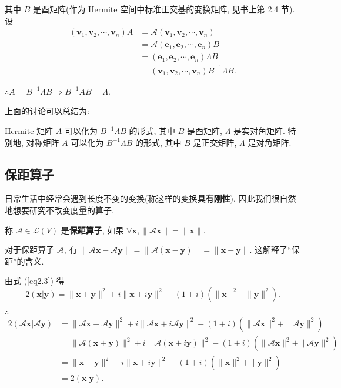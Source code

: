 \documentclass[color=black,device=normal,lang=cn,mode=geye]{elegantnote}
\begin{document}
其中 $B$ 是酉矩阵(作为 Hermite 空间中标准正交基的变换矩阵, 见书上第 2.4 节). 设
\begin{align*}
    (\boldsymbol{v}_1,\boldsymbol{v}_2,\cdots,\boldsymbol{v}_n)A & =\mathcal{A}(\boldsymbol{v}_1,\boldsymbol{v}_2,\cdots,\boldsymbol{v}_n) \\
    & =\mathcal{A}(\boldsymbol{e}_1,\boldsymbol{e}_2,\cdots,\boldsymbol{e}_n)B \\
    & =(\boldsymbol{e}_1,\boldsymbol{e}_2,\cdots,\boldsymbol{e}_n)\Lambda B \\
    & =(\boldsymbol{v}_1,\boldsymbol{v}_2,\cdots,\boldsymbol{v}_n)B^{-1}\Lambda B.
\end{align*}

$\therefore A=B^{-1}\Lambda B\Rightarrow B^{-1}AB=\Lambda$.

上面的讨论可以总结为:
\begin{corollary}\label{c3.2}
    Hermite 矩阵 $A$ 可以化为 $B^{-1}\Lambda B$ 的形式, 其中 $B$ 是酉矩阵, $\Lambda$ 是实对角矩阵. 特别地, 对称矩阵 $A$ 可以化为 $B^{-1}\Lambda B$ 的形式, 其中 $B$ 是正交矩阵, $\Lambda$ 是对角矩阵.
\end{corollary}
\subsection{保距算子}
日常生活中经常会遇到长度不变的变换(称这样的变换\textbf{具有刚性}), 因此我们很自然地想要研究不改变度量的算子.
\begin{definition}
    称 $\mathcal{A}\in\mathcal{L}(V)$ 是\textbf{保距算子}, 如果 $\forall\boldsymbol{x},\|\mathcal{A}\boldsymbol{x}\|=\|\boldsymbol{x}\|$.
\end{definition}
对于保距算子 $\mathcal{A}$, 有 $\|\mathcal{A}\boldsymbol{x}-\mathcal{A}\boldsymbol{y}\|=\|\mathcal{A}(\boldsymbol{x}-\boldsymbol{y})\|=\|\boldsymbol{x}-\boldsymbol{y}\|$. 这解释了``保距''的含义.

由式 (\ref{eq2.3}) 得
\[2(\boldsymbol{x}|\boldsymbol{y})=\|\boldsymbol{x}+\boldsymbol{y}\|^2+i\|\boldsymbol{x}+i\boldsymbol{y}\|^2-(1+i)(\|\boldsymbol{x}\|^2+\|\boldsymbol{y}\|^2).\]

$\therefore$
\begin{align*}
    2(\mathcal{A}\boldsymbol{x}|\mathcal{A}\boldsymbol{y}) & =\|\mathcal{A}\boldsymbol{x}+\mathcal{A}\boldsymbol{y}\|^2+i\|\mathcal{A}\boldsymbol{x}+i\mathcal{A}\boldsymbol{y}\|^2-(1+i)(\|\mathcal{A}\boldsymbol{x}\|^2+\|\mathcal{A}\boldsymbol{y}\|^2) \\
    & =\|\mathcal{A}(\boldsymbol{x}+\boldsymbol{y})\|^2+i\|\mathcal{A}(\boldsymbol{x}+i\boldsymbol{y})\|^2-(1+i)(\|\mathcal{A}\boldsymbol{x}\|^2+\|\mathcal{A}\boldsymbol{y}\|^2) \\
    & =\|\boldsymbol{x}+\boldsymbol{y}\|^2+i\|\boldsymbol{x}+i\boldsymbol{y}\|^2-(1+i)(\|\boldsymbol{x}\|^2+\|\boldsymbol{y}\|^2) \\
    & =2(\boldsymbol{x}|\boldsymbol{y}).
\end{align*}
\end{document}
